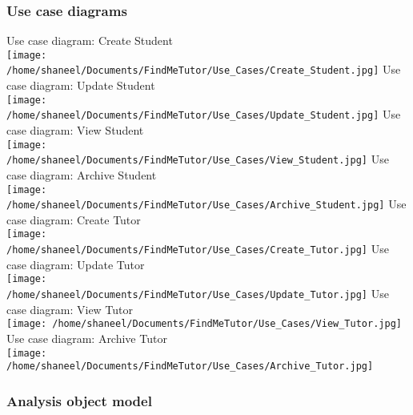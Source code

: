 \documentclass[12pt]{article}
\begin{document}
\subsubsection{Use case diagrams}
{
		

		\centering
		Use case diagram: Create Student	\\
		\texttt{[image: /home/shaneel/Documents/FindMeTutor/Use\_Cases/Create\_Student.jpg]}
		Use case diagram: Update Student \\
		\centering
		\texttt{[image: /home/shaneel/Documents/FindMeTutor/Use\_Cases/Update\_Student.jpg]}
		Use case diagram: View Student \\
		\centering
		\texttt{[image: /home/shaneel/Documents/FindMeTutor/Use\_Cases/View\_Student.jpg]}
		Use case diagram: Archive Student \\
		\centering
		\texttt{[image: /home/shaneel/Documents/FindMeTutor/Use\_Cases/Archive\_Student.jpg]}
		Use case diagram: Create Tutor\\
		\centering
		\texttt{[image: /home/shaneel/Documents/FindMeTutor/Use\_Cases/Create\_Tutor.jpg]}
		Use case diagram: Update Tutor \\
		\centering
		\texttt{[image: /home/shaneel/Documents/FindMeTutor/Use\_Cases/Update\_Tutor.jpg]}
		Use case diagram: View Tutor \\
		\centering
		\texttt{[image: /home/shaneel/Documents/FindMeTutor/Use\_Cases/View\_Tutor.jpg]}
		Use case diagram: Archive Tutor \\
		\centering
		\texttt{[image: /home/shaneel/Documents/FindMeTutor/Use\_Cases/Archive\_Tutor.jpg]}
		
		
}

		
\newpage
\subsubsection{Analysis object model}
\end{document}

